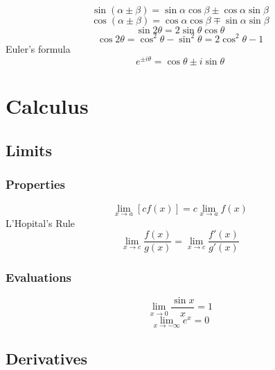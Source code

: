\documentclass{article}
\begin{document}
		\begin{equation}
			\sin \left( {\alpha \pm \beta} \right) = \sin \alpha \cos \beta \pm \cos \alpha \sin \beta
		\end{equation}
		\begin{equation}
			\cos \left( {\alpha \pm \beta } \right) = \cos \alpha \cos \beta \mp \sin \alpha \sin \beta
		\end{equation}
		\begin{equation}
			\sin 2\theta = 2\sin \theta \cos \theta
		\end{equation}
		\begin{equation}
			\cos 2\theta = \cos ^2 \theta - \sin ^2 \theta = 2\cos ^2 \theta - 1
		\end{equation}
		Euler's formula		
		\begin{equation}
			e^{ \pm i\theta } = \cos \theta \pm i\sin \theta
		\end{equation}
\section{Calculus}
	\subsection{Limits}
		\subsubsection{Properties}
			\begin{equation}
				\mathop {\lim }\limits_{x \to a} \left[ cf(x) \right] = c\mathop{\lim }\limits_{x \to a} f(x)
			\end{equation}
			L'Hopital's Rule
			\begin{equation}
				\mathop {\lim }\limits_{x \to c} \frac{{f\left( x \right)}}{{g\left( x \right)}} = \mathop {\lim }\limits_{x \to c} \frac{{f'\left( x \right)}}{{g'\left( x \right)}}
			\end{equation}
		\subsubsection{Evaluations}
			\begin{equation}
				\mathop {\lim }\limits_{x \to 0} \frac{{\sin x}}{x} = 1
			\end{equation}
			\begin{equation}
				\mathop {\lim }\limits_{x \to - \infty } e^x = 0
			\end{equation}
	\subsection{Derivatives}
\end{document}
